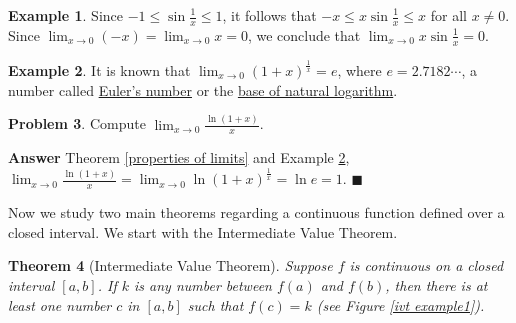 \documentclass[12pt,letterpaper]{book}
\numberwithin{equation}{section}
\newtheorem{thm}{\textbf{Theorem}}[section]
\theoremstyle{definition}
\newtheorem{problem}[thm]{\textbf{Problem}}
\newtheorem{example}[thm]{\textbf{Example}}
\newenvironment{answer}{\noindent\textbf{Answer}}{\hfill$\blacksquare$\vspace{0.1in}}
\begin{document}
\begin{example}
Since $-1\leq \sin \frac{1}{x} \leq 1$, it follows that $-x\leq x\sin \frac{1}{x} \leq x$ for all $x\neq 0$. Since $\displaystyle{\lim_{x\to 0}(-x)=\lim_{x\to 0}x=0}$, we conclude that $\displaystyle{\lim_{x\to 0}x\sin \frac{1}{x}=0}$.
\end{example}

\begin{example} \label{euler}
It is known that $\displaystyle{\lim_{x\to 0} (1+x)^{\frac{1}{x}}=e}$, where $e=2.7182\cdots$, a number called \underline{Euler's number} or the \underline{base of natural logarithm}.
\end{example}

\begin{problem}
Compute $\displaystyle{\lim_{x\to 0}\frac{\ln(1+x)}{x}}$.
\end{problem}

\begin{answer}
Theorem \ref{properties of limits} and Example \ref{euler}, $\displaystyle{\lim_{x\to 0}\frac{\ln(1+x)}{x}=\lim_{x\to 0} \ln (1+x)^{\frac{1}{x}}=\ln e=1}$.
\end{answer}

Now we study two main theorems regarding a continuous function defined over a closed interval. We start with the Intermediate Value Theorem.

\begin{thm}[Intermediate Value Theorem] Suppose $f$ is continuous on a closed interval $[a,b]$. If $k$ is any number between $f(a)$ and $f(b)$, then there is at least one number $c$ in $[a,b]$ such that $f(c)=k$ (see Figure \ref{ivt example1}).
\end{thm}
\end{document}
